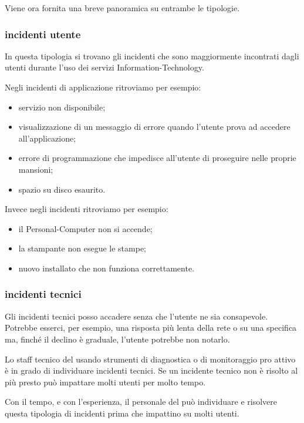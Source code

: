 Viene ora fornita una breve panoramica su entrambe le tipologie.

\subsubsection[Incidenti utente]{incidenti utente}
In questa tipologia si trovano gli incidenti che sono maggiormente incontrati dagli utenti durante l'uso dei servizi \acs{Information-Technology}.

Negli incidenti di applicazione ritroviamo per esempio:

\begin{itemize}
\item{servizio non disponibile;}
\item{visualizzazione di un messaggio di errore quando l'utente prova ad accedere all'applicazione;}
\item{errore di programmazione che impedisce all'utente di proseguire nelle proprie mansioni;}
\item{spazio su disco esaurito.}
\end{itemize}

Invece negli incidenti  ritroviamo per esempio:

\begin{itemize}
\item{il \acs{Personal-Computer} non si accende;}
\item{la stampante non esegue le stampe;}
\item{nuovo  installato che non funziona correttamente.}
\end{itemize}

\subsubsection[Incidenti tecnici]{incidenti tecnici}
Gli incidenti tecnici posso accadere senza che l'utente ne sia consapevole. Potrebbe esserci, per esempio, una risposta più lenta della rete o su una specifica  ma, finché il declino è graduale, l'utente potrebbe non notarlo.

Lo staff tecnico del  usando strumenti di diagnostica o di monitoraggio pro attivo è in grado di individuare incidenti tecnici. Se un incidente tecnico non è risolto al più presto può impattare molti utenti per molto tempo.

Con il tempo, e con l'esperienza, il personale del  può individuare e risolvere questa tipologia di incidenti prima che impattino su molti utenti.

